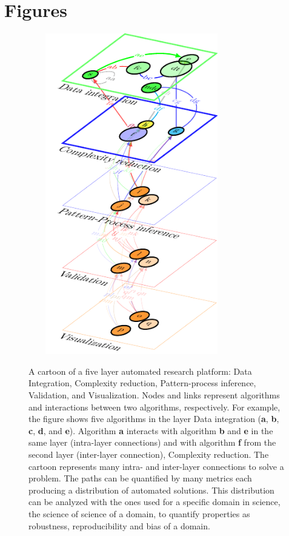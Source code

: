 \documentclass[english,12pt]{article}
\begin{document}
\section{Figures}

\vspace{-7 in}
\begin{figure}
  \vspace{-7 in}
\begin{center}
  \hspace{-0.5 in}\includegraphics[width=9cm,height=14cm]{Figure1.pdf}\\
\end{center}
\caption{A cartoon of a five layer automated research platform: Data
  Integration, Complexity reduction, Pattern-process inference,
  Validation, and Visualization. Nodes and links represent algorithms
  and interactions between two algorithms, respectively. For example,
  the figure shows five algorithms in the layer Data integration
  ({\bf a}, {\bf b}, {\bf c}, {\bf d}, and {\bf e}). Algorithm {\bf a}
  interacts with algorithm {\bf b} and {\bf e} in the same layer
  (intra-layer connections) and with algorithm {\bf f} from the second
  layer (inter-layer connection), Complexity reduction. The cartoon
  represents many intra- and inter-layer connections to solve a
  problem. The paths can be quantified by many metrics each producing
  a distribution of automated solutions. This distribution can be
  analyzed with the ones used for a specific domain in science, the
  science of science of a domain, to quantify properties as
  robustness, reproducibility and bias of a domain.}
\label{}
\end{figure}
\end{document}

